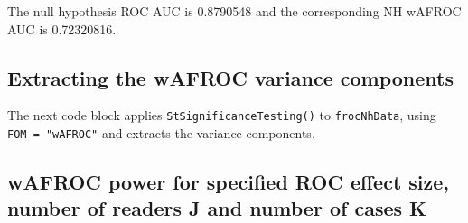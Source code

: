 \documentclass[
]{book}
\newenvironment{Shaded}{\begin{snugshade}}{\end{snugshade}}
\newcommand{\DataTypeTok}[1]{\textcolor[rgb]{0.13,0.29,0.53}{#1}}
\newcommand{\KeywordTok}[1]{\textcolor[rgb]{0.13,0.29,0.53}{\textbf{#1}}}
\newcommand{\NormalTok}[1]{#1}
\newcommand{\OperatorTok}[1]{\textcolor[rgb]{0.81,0.36,0.00}{\textbf{#1}}}
\newcommand{\StringTok}[1]{\textcolor[rgb]{0.31,0.60,0.02}{#1}}
\begin{document}
\begin{Shaded}
\end{Shaded}

The null hypothesis ROC AUC is 0.8790548 and the corresponding NH wAFROC AUC is 0.72320816.

\hypertarget{extracting-the-wafroc-variance-components}{%
\subsection{Extracting the wAFROC variance components}\label{extracting-the-wafroc-variance-components}}

The next code block applies \texttt{StSignificanceTesting()} to \texttt{frocNhData}, using \texttt{FOM\ =\ "wAFROC"} and extracts the variance components.

\begin{Shaded}
\end{Shaded}

\hypertarget{wafroc-power-for-specified-roc-effect-size-number-of-readers-j-and-number-of-cases-k}{%
\subsection{wAFROC power for specified ROC effect size, number of readers J and number of cases K}\label{wafroc-power-for-specified-roc-effect-size-number-of-readers-j-and-number-of-cases-k}}
\end{document}
